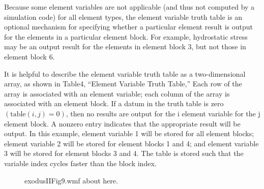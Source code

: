 Because some element variables are not applicable (and thus not
computed by a simulation code) for all element types, the element
variable truth table is an optional mechanism for specifying whether a
particular element result is output for the elements in a particular
element block. For example, hydrostatic stress may be an output result
for the elements in element block 3, but not those in element block 6.


It is helpful to describe the element variable truth 
table as a two-dimensional array, as shown in  Table{\nobreakspace}4, 
``Element Variable Truth Table,'' Each row of the array is associated 
with an element variable; each column of the array is associated 
with an element block. If a datum in the truth table is zero 
$(\textrm{table}(i,j)=0)$, then no results are output for the {i}\th{} 
element variable for the {j}\th{} element block. A nonzero 
entry indicates that the appropriate result will be output. In 
this example, element variable 1 will be stored for all element 
blocks; element variable 2 will be stored for element blocks 
1 and 4; and element variable 3 will be stored for element blocks 
3 and 4. The table is stored such that the variable index cycles 
faster than the block index.
\begin{figure}[htbp]
\begin{center}
\caption{exodusIIFig9.wmf about here.}
\end{center}
\end{figure}
